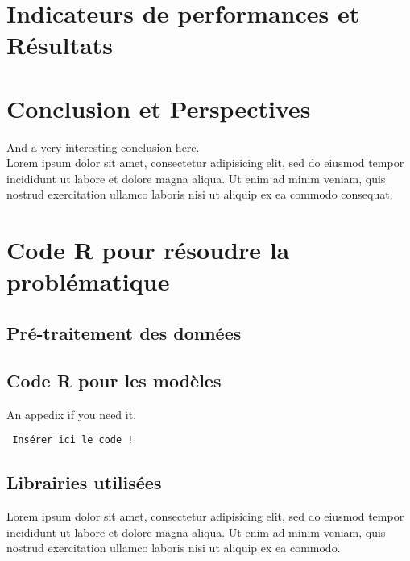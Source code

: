 \documentclass[a4paper, oneside, 12pt, final]{extreport}
\begin{document}
\chapter{Indicateurs de performances et Résultats}
\label{chap:3}


\chapter*{Conclusion et Perspectives}
\label{chap:conclusion}
%
  And a very interesting conclusion here\@. ~\\
  Lorem ipsum dolor sit amet, consectetur adipisicing elit, sed do eiusmod
  tempor incididunt ut labore et dolore magna aliqua. Ut enim ad minim veniam,
  quis nostrud exercitation ullamco laboris nisi ut aliquip ex ea commodo
  consequat.

\newpage
\appendix
{}

\chapter{Code R pour résoudre la problématique}
\label{chap:appendix}


\section{Pré-traitement des données}
\section{Code R pour les modèles}

 An appedix if you need it.
 
 \begin{verbatim}
 Insérer ici le code !
 \end{verbatim}

\section{Librairies utilisées}
 
  Lorem ipsum dolor sit amet, consectetur adipisicing elit, sed do eiusmod
  tempor incididunt ut labore et dolore magna aliqua. Ut enim ad minim veniam,
  quis nostrud exercitation ullamco laboris nisi ut aliquip ex ea commodo.


\nocite{*}
\end{document}
